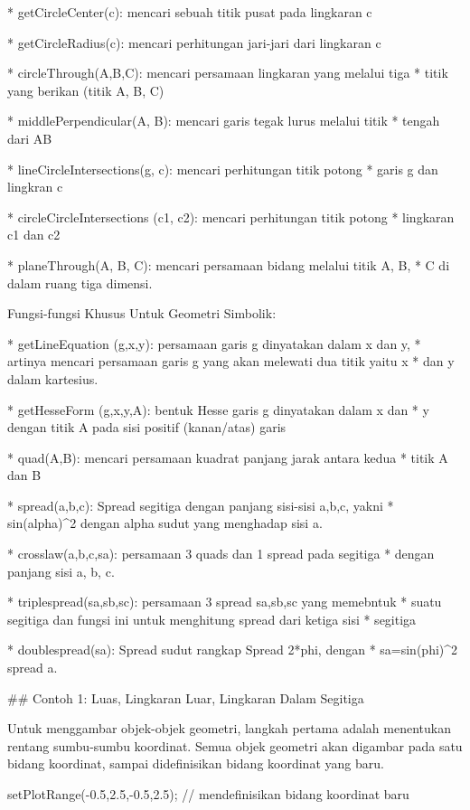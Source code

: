 \documentclass{article}
\begin{document}
* 
getCircleCenter(c): mencari sebuah titik pusat pada lingkaran c

* 
getCircleRadius(c): mencari perhitungan jari-jari dari lingkaran c

* 
circleThrough(A,B,C): mencari persamaan lingkaran yang melalui tiga
* titik yang berikan (titik A, B, C)

* 
middlePerpendicular(A, B): mencari garis tegak lurus melalui titik
* tengah dari AB

* 
lineCircleIntersections(g, c): mencari perhitungan titik potong
* garis g dan lingkran c

* 
circleCircleIntersections (c1, c2): mencari perhitungan titik potong
* lingkaran c1 dan c2

* 
planeThrough(A, B, C): mencari persamaan bidang melalui titik A, B,
* C di dalam ruang tiga dimensi.


Fungsi-fungsi Khusus Untuk Geometri Simbolik:


* 
getLineEquation (g,x,y): persamaan garis g dinyatakan dalam x dan y,
* artinya mencari persamaan garis g yang akan melewati dua titik yaitu x
* dan y dalam kartesius.

* 
getHesseForm (g,x,y,A): bentuk Hesse garis g dinyatakan dalam x dan
* y dengan titik A pada sisi positif (kanan/atas) garis

* 
quad(A,B): mencari persamaan kuadrat panjang jarak antara kedua
* titik A dan B

* 
spread(a,b,c): Spread segitiga dengan panjang sisi-sisi a,b,c, yakni
* sin(alpha)^2 dengan alpha sudut yang menghadap sisi a.

* 
crosslaw(a,b,c,sa): persamaan 3 quads dan 1 spread pada segitiga
* dengan panjang sisi a, b, c.

* 
triplespread(sa,sb,sc): persamaan 3 spread sa,sb,sc yang memebntuk
* suatu segitiga dan fungsi ini untuk menghitung spread dari ketiga sisi
* segitiga

* 
doublespread(sa): Spread sudut rangkap Spread 2*phi, dengan
* sa=sin(phi)^2 spread a.


## Contoh 1: Luas, Lingkaran Luar, Lingkaran Dalam Segitiga

Untuk menggambar objek-objek geometri, langkah pertama adalah
menentukan rentang sumbu-sumbu koordinat. Semua objek geometri akan
digambar pada satu bidang koordinat, sampai didefinisikan bidang
koordinat yang baru.


\>setPlotRange(-0.5,2.5,-0.5,2.5); // mendefinisikan bidang koordinat baru 
\end{document}
